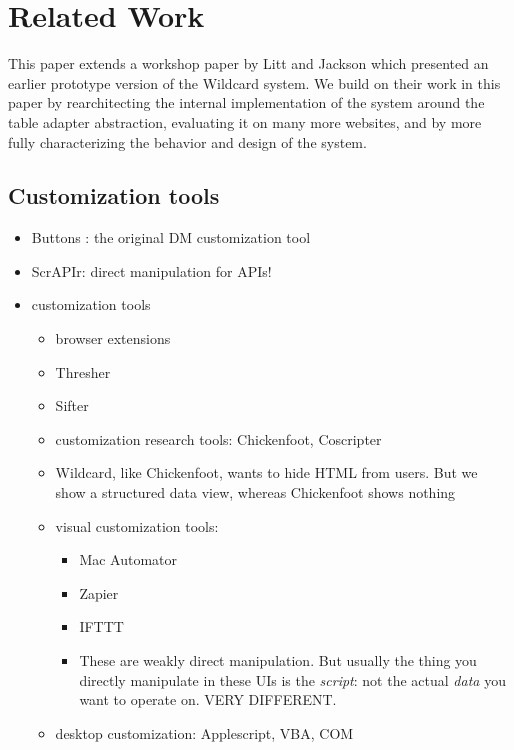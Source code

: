 \documentclass[sigplan,10pt,anonymous,review]{acmart}
\providecommand{\tightlist}{%
  \setlength{\itemsep}{0pt}\setlength{\parskip}{0pt}}
\begin{document}
\hypertarget{sec:related-work}{%
\section{Related Work}\label{sec:related-work}}

This paper extends a workshop paper by Litt and Jackson \citep{litt2020}
which presented an earlier prototype version of the Wildcard system. We
build on their work in this paper by rearchitecting the internal
implementation of the system around the table adapter abstraction,
evaluating it on many more websites, and by more fully characterizing
the behavior and design of the system.

\hypertarget{customization-tools}{%
\subsection{Customization tools}\label{customization-tools}}

\begin{itemize}
\item
  Buttons \citep{maclean1990}: the original DM customization tool
\item
  ScrAPIr: direct manipulation for APIs!
\item
  customization tools

  \begin{itemize}
  \item
    browser extensions
  \item
    Thresher
  \item
    Sifter
  \item
    customization research tools: Chickenfoot, Coscripter
  \item
    Wildcard, like Chickenfoot, wants to hide HTML from users. But we
    show a structured data view, whereas Chickenfoot shows nothing
  \item
    visual customization tools:

    \begin{itemize}
    \tightlist
    \item
      Mac Automator
    \item
      Zapier
    \item
      IFTTT
    \item
      These are weakly direct manipulation. But usually the thing you
      directly manipulate in these UIs is the \emph{script}: not the
      actual \emph{data} you want to operate on. VERY DIFFERENT.
    \end{itemize}
  \item
    desktop customization: Applescript, VBA, COM
  \end{itemize}
\end{itemize}
\end{document}
